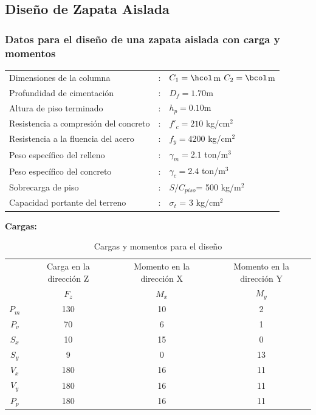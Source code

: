 \documentclass{article}%
\begin{document}
\subsection{Diseño de Zapata Aislada}%
\label{subsec:DiseodeZapataAislada}%
\FPset{}
\FPset{}
%
\subsubsection{Datos para el diseño de una zapata aislada con carga y momentos}

\begin{table}[h!]
    \centering

    \begin{tabular}{lcl} %
        Dimensiones de la columna               &:& $C_1        = \hcol$m \quad $C_2 = \bcol$m\\
        Profundidad de cimentación              &:& $D_f        = 1.70 $m\\
        Altura de piso terminado                &:& $h_p        = 0.10$m\\
        Resistencia a compresión del concreto   &:& $f'_c       = 210$ kg/cm$^2$ \\
        Resistencia a la fluencia del acero     &:& $f_y        = 4200$ kg/cm$^2$ \\
        Peso específico del relleno             &:& $\gamma_m   = 2.1$ ton/m$^3$ \\
        Peso específico del concreto            &:& $\gamma_c   = 2.4$ ton/m$^3$ \\
        Sobrecarga de piso                      &:& $S/C_{piso}$= 500 kg/m$^2$ \\ 
        Capacidad portante del terreno          &:& $\sigma_t$  = 3 kg/cm$^2$  \\ %
        
    \end{tabular}
\end{table}

\textbf{Cargas:}


\begin{table}[h!]
    \centering
    \begin{tabular}{cccc} \toprule
         & Carga en la dirección Z & Momento en la dirección X & Momento en la dirección Y  \\ 
         & $F_z$ & $M_x $ & $M_y$ \\ \midrule
        $P_m$ & 130& 10 & 2 \\
        $P_v$ & 70 & 6 & 1 \\
        $S_x$ & 10 & 15 & 0 \\
        $S_y$ & 9 & 0 & 13 \\
        $V_x$ & 180 & 16 & 11 \\
        $V_y$ & 180 & 16 & 11 \\
        $P_p$ & 180 & 16 & 11 \\\bottomrule
    \end{tabular}
    \caption{Cargas y momentos para el diseño}
    \label{tab:my_label}
\end{table}
\end{document}
